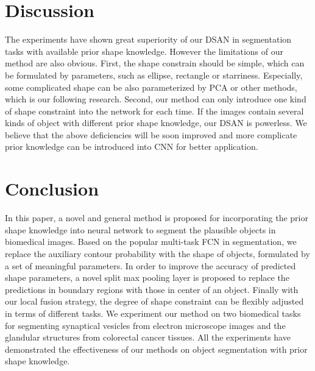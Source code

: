 \documentclass[10pt,twocolumn,letterpaper]{article}
\begin{document}





\section{Discussion}
The experiments have shown great superiority of our DSAN in segmentation tasks with available prior shape knowledge.
However the limitations of our method are also obvious.
First, the shape constrain should be simple, which can be formulated by parameters, such as ellipse, rectangle or starriness.
Especially, some complicated shape can be also parameterized by PCA or other methods, which is our following research.
Second, our method can only introduce one kind of shape constraint into the network for each time.
If the images contain several kinds of object with different prior shape knowledge, our DSAN is powerless.
We believe that the above deficiencies will be soon improved and more complicate prior knowledge can be introduced into CNN for better application. 

\section{Conclusion}
In this paper, a novel and general method is proposed for incorporating the prior shape knowledge into neural network to segment the plausible objects in biomedical images.
Based on the popular multi-task FCN in segmentation, we replace the auxiliary contour probability with the shape of objects, formulated by a set of meaningful parameters.
In order to improve the accuracy of predicted shape parameters, a novel split max pooling layer is proposed to replace the predictions in boundary regions with those in center of an object.
Finally with our local fusion strategy, the degree of shape constraint can be flexibly adjusted in terms of different tasks.
We experiment our method on two biomedical tasks for segmenting synaptical vesicles from electron microscope images and the glandular structures from colorectal cancer tissues.
All the experiments have demonstrated the effectiveness of our methods on object segmentation with prior shape knowledge.

{\small


}
\end{document}
